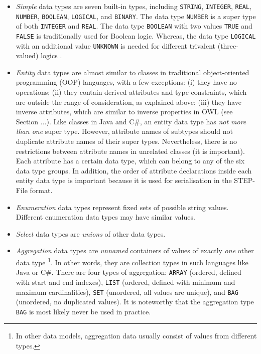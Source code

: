 \begin{itemize}

\item
\emph{Simple} data types are seven built-in types, including \texttt{STRING}, \texttt{INTEGER}, \texttt{REAL}, \texttt{NUMBER}, \texttt{BOOLEAN}, \texttt{LOGICAL}, and \texttt{BI\-NARY}.
The data type \texttt{NUMBER} is a super type of both \texttt{INTEGER} and \texttt{REAL}.
The data type \texttt{BOOLEAN} with two values \texttt{TRUE} and \texttt{FALSE} is traditionally used for Boolean logic.
Whereas, the data type \texttt{LOGICAL} with an additional value \texttt{UNKNOWN} is needed for different trivalent (three-valued) logics \cite{fronthofer2011manyvaluedlogics}.

\item
\emph{Entity} data types are almost similar to classes in traditional object-oriented programming (OOP) languages, with a few exceptions:
(i) they have no operations;
(ii) they contain derived attributes and type constraints, which are outside the range of consideration, as explained above;
(iii) they have inverse attributes, which are similar to inverse properties in OWL (see Section ...).
Like classes in Java and C{\#}, an entity data type has \emph{not more than one} super type.
However, attribute names of subtypes should not duplicate attribute names of their super types.
Nevertheless, there is no restrictions between attribute names in unrelated classes (it is important).
Each attribute has a certain data type, which can belong to any of the six data type groups.
In addition, the order of attribute declarations inside each entity data type is important because it is used for serialisation in the STEP-File format.

\item
\emph{Enumeration} data types represent fixed sets of possible string values. Different enumeration data types may have similar values.

\item
\emph{Select} data types are \emph{unions} of other data types.

\item
\emph{Aggregation} data types are \emph{unnamed} containers of values of exactly \emph{one} other data type
\footnote{In other data models, aggregation data usually consist of values from different types.}.
In other words, they are collection types in such languages like Java or C{\#}.
There are four types of aggregation: \texttt{ARRAY} (ordered, defined with start and end indexes), \texttt{LIST} (ordered, defined with minimum and maximum cardinalities), \texttt{SET} (unordered, all values are unique), and \texttt{BAG} (unordered, no duplicated values).
It is noteworthy that the aggregation type \texttt{BAG} is most likely never be used in practice.



\end{itemize}

